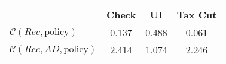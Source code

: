 \begin{tabular}{@{}lccc@{}}
\toprule
                          & Check      & UI    & Tax Cut    \\  \midrule
$\mathcal{C}(Rec,\text{policy})$ & 0.137  & 0.488  & 0.061     \\
$\mathcal{C}(Rec, AD,\text{policy})$ & 2.414  & 1.074  & 2.246     \\
\end{tabular}
